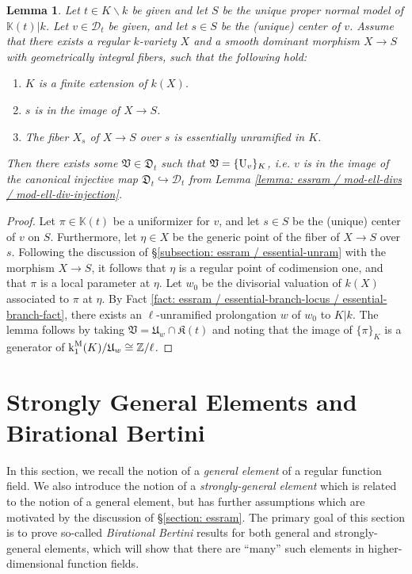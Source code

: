 \documentclass[11pt]{amsart}
\newtheorem{lemma}[proposition]{Lemma}
\theoremstyle{definition}
\theoremstyle{remark}
\numberwithin{equation}{section}
\newcommand{\Z}{\mathbb{Z}}
\newcommand{\U}{{\rm U}}
\newcommand{\Kbb}{\mathbb{K}}
\newcommand{\Dcal}{\mathscr{D}}
\newcommand{\Kfrak}{\mathfrak{K}}
\newcommand{\Ufrak}{\mathfrak{U}}
\newcommand{\Dfrak}{\mathfrak{D}}
\newcommand{\Vfrak}{\mathfrak{V}}
\renewcommand{\k}{\operatorname{k}^{\rm M}}
\begin{document}
\begin{lemma}
\label{lemma: essram / mod-ell-divs / fibers}
  Let $t \in K \smallsetminus k$ be given and let $S$ be the unique proper normal model of $\Kbb(t)|k$.
  Let $v \in \Dcal_t$ be given, and let $s \in S$ be the (unique) center of $v$.
  Assume that there exists a regular $k$-variety $X$ and a smooth dominant morphism $X \rightarrow S$ with geometrically integral fibers, such that the following hold:
  \begin{enumerate}
    \item $K$ is a finite extension of $k(X)$.
    \item $s$ is in the image of $X \rightarrow S$.
    \item The fiber $X_s$ of $X \rightarrow S$ over $s$ is essentially unramified in $K$.
  \end{enumerate}
  Then there exists some $\Vfrak \in \Dfrak_t$ such that $\Vfrak = \{\U_v\}_K$, i.e. $v$ is in the image of the canonical injective map $\Dfrak_t \hookrightarrow \Dcal_t$ from Lemma \ref{lemma: essram / mod-ell-divs / mod-ell-div-injection}.
\end{lemma}
\begin{proof}
  Let $\pi \in \Kbb(t)$ be a uniformizer for $v$, and let $s \in S$ be the (unique) center of $v$ on $S$.
  Furthermore, let $\eta \in X$ be the generic point of the fiber of $X \rightarrow S$ over $s$.
  Following the discussion of \S\ref{subsection: essram / essential-unram} with the morphism $X \rightarrow S$, it follows that $\eta$ is a regular point of codimension one, and that $\pi$ is a local parameter at $\eta$.
  Let $w_0$ be the divisorial valuation of $k(X)$ associated to $\pi$ at $\eta$.
  By Fact \ref{fact: essram / essential-branch-locus / essential-branch-fact}, there exists an $\ell$-unramified prolongation $w$ of $w_0$ to $K|k$.
  The lemma follows by taking $\Vfrak = \Ufrak_w \cap \Kfrak(t)$ and noting that the image of $\{\pi\}_K$ is a generator of $\k_1(K)/\Ufrak_w \cong \Z/\ell$.
\end{proof}

\section{Strongly General Elements and Birational Bertini}
\label{section: strgen}


In this section, we recall the notion of a \emph{general element} of a regular function field.
We also introduce the notion of a \emph{strongly-general element} which is related to the notion of a general element, but has further assumptions which are motivated by the discussion of \S\ref{section: essram}.
The primary goal of this section is to prove so-called \emph{Birational Bertini} results for both general and strongly-general elements, which will show that there are ``many'' such elements in higher-dimensional function fields.
\end{document}
